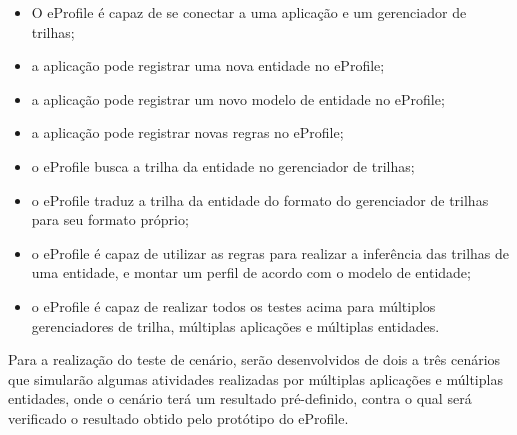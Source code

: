 \begin{itemize}

\item O eProfile é capaz de se conectar a uma aplicação e um gerenciador de trilhas;
\item a aplicação pode registrar uma nova entidade no eProfile;
\item a aplicação pode registrar um novo modelo de entidade no eProfile;
\item a aplicação pode registrar novas regras no eProfile;
\item o eProfile busca a trilha da entidade no gerenciador de trilhas;
\item o eProfile traduz a trilha da entidade do formato do gerenciador de trilhas para seu formato próprio;
\item o eProfile é capaz de utilizar as regras para realizar a inferência das trilhas de uma entidade, e montar um perfil de acordo com o modelo de entidade;
\item o eProfile é capaz de realizar todos os testes acima para múltiplos gerenciadores de trilha, múltiplas aplicações e múltiplas entidades.

\end{itemize}

Para a realização do teste de cenário, serão desenvolvidos de dois a três cenários que simularão algumas atividades realizadas por múltiplas aplicações e múltiplas entidades, onde o cenário terá um resultado pré-definido, contra o qual será verificado o resultado obtido pelo protótipo do eProfile.
